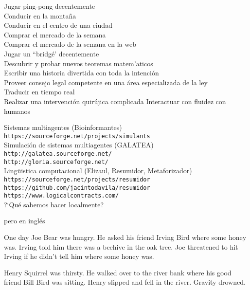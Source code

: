 \documentclass[10pt]{article}
\begin{document}
\begin{huge}
\blob Jugar ping-pong decentemente \\
\blob Conducir en la monta{\~n}a \\
\blob Conducir en el centro de una ciudad \\
\blob Comprar el mercado de la semana \\
\blob Comprar el mercado de la semana en la web \\
\blob Jugar un ``bridg{\'e}' decentemente \\
\blob Descubrir y probar nuevos teoremas matem'aticos \\
\blob Escribir una historia divertida con toda la intenci{\'o}n \\
\blob Proveer consejo legal competente en una {\'a}rea especializada de la ley\\
\blob Traducir en tiempo real\\
\blob Realizar una intervenci{\'o}n quir{\'u}jica complicada
\blob Interactuar con fluidez con humanos


\blob Sistemas multiagentes (Bioinformantes)\\
\verb|https://sourceforge.net/projects/simulants|\\
\blob Simulaci{\'o}n de sistemas multiagentes (GALATEA)\\
\verb|http://galatea.sourceforge.net/|\\
\verb|http://gloria.sourceforge.net/|\\
\blob Ling{\"u}istica computacional (Elizaul, Resumidor, Metaforizador)\\
\verb|https://sourceforge.net/projects/resumidor|\\
\verb|https://github.com/jacintodavila/resumidor|\\
\verb|https://www.logicalcontracts.com/|\\

\blob ?`Qu{\'e} sabemos hacer localmente?


pero en ingl{\'e}s

One day Joe Bear was hungry. He asked his friend Irving Bird where some
honey was. Irving told him there was a beehive in the oak tree. Joe threatened
to hit Irving if he didn't tell him where some honey was.

Henry Squirrel was thirsty. He walked over to the river bank where his
good friend Bill Bird was sitting. Henry slipped and fell in the
river. Gravity drowned.


\end{huge}
\end{document}
